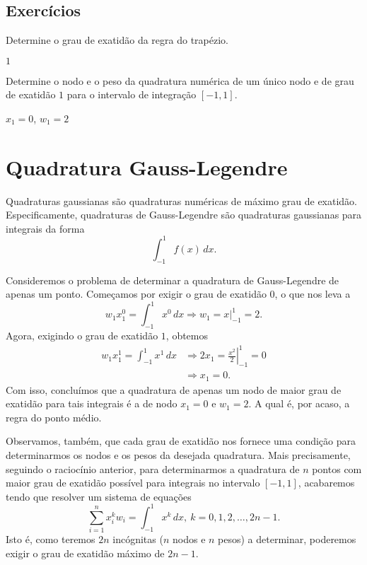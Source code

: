 \subsection*{Exercícios}

\begin{exer}
  Determine o grau de exatidão da regra do trapézio.
\end{exer}
\begin{resp}
  $1$
\end{resp}

\begin{exer}
  Determine o nodo e o peso da quadratura numérica de um único nodo e de grau de exatidão $1$ para o intervalo de integração $[-1, 1]$.
\end{exer}
\begin{resp}
  $x_1=0$, $w_1=2$
\end{resp}

\section{Quadratura Gauss-Legendre}\label{cap_integr_sec_Gauss-Legendre}

Quadraturas gaussianas são quadraturas numéricas de máximo grau de exatidão. Especificamente, quadraturas de Gauss-Legendre são quadraturas gaussianas para integrais da forma
\begin{equation}
  \int_{-1}^1 f(x)\,dx.
\end{equation}

Consideremos o problema de determinar a quadratura de Gauss-Legendre de apenas um ponto. Começamos por exigir o grau de exatidão $0$, o que nos leva a
\begin{equation}
  w_1x_1^0 = \int_{-1}^1 x^0\,dx \Rightarrow w_1 = x|_{-1}^1 = 2.
\end{equation}
Agora, exigindo o grau de exatidão $1$, obtemos
\begin{align}
  w_1x_1^1 = \int_{-1}^1 x^1\,dx &\Rightarrow 2x_1 = \left.\frac{x^2}{2}\right|_{-1}^1 = 0\\
  &\Rightarrow x_1=0.
\end{align}
Com isso, concluímos que a quadratura de apenas um nodo de maior grau de exatidão para tais integrais é a de nodo $x_1=0$ e $w_1=2$. A qual é, por acaso, a regra do ponto médio.

Observamos, também, que cada grau de exatidão nos fornece uma condição para determinarmos os nodos e os pesos da desejada quadratura. Mais precisamente, seguindo o raciocínio anterior, para determinarmos a quadratura de $n$ pontos com maior grau de exatidão possível para integrais no intervalo $[-1, 1]$, acabaremos tendo que resolver um sistema de equações
\begin{equation}\label{eq:quad_gauss_sys}
  \sum_{i=1}^n x_i^kw_i = \int_{-1}^1 x^k\,dx,~k=0,1,2,\ldots, 2n-1.
\end{equation}
Isto é, como teremos $2n$ incógnitas ($n$ nodos e $n$ pesos) a determinar, poderemos exigir o grau de exatidão máximo de $2n-1$.

